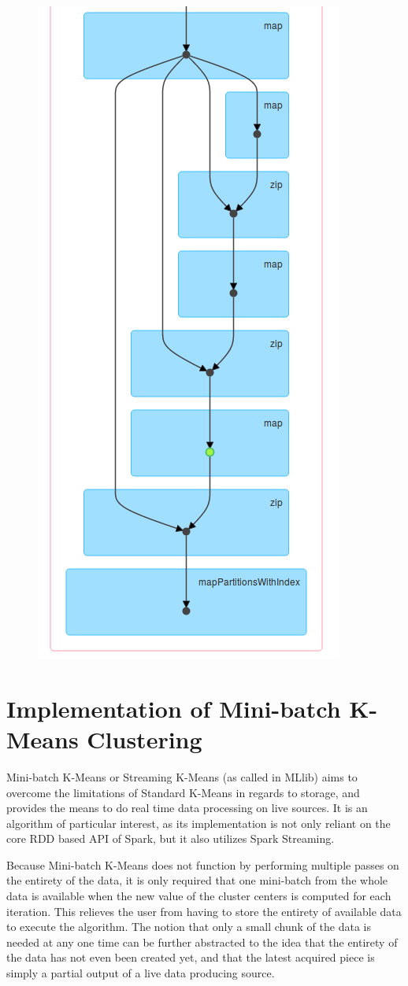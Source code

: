 \documentclass{l4proj}
\begin{document}
\begin{figure}[H]
\begin{minipage}{.5\textwidth}
  \includegraphics[width=0.6\linewidth]{images/DAG2}
  \label{fig:dag2}
\end{minipage}
\end{figure}

\section{Implementation of Mini-batch K-Means Clustering}

Mini-batch K-Means or Streaming K-Means (as called in MLlib) aims to overcome the limitations of Standard K-Means in regards to storage, and provides the means to do real time data processing on live sources. It is an algorithm of particular interest, as its implementation is not only reliant on the core RDD based API of Spark, but it also utilizes Spark Streaming.

Because Mini-batch K-Means does not function by performing multiple passes on the entirety of the data, it is only required that one mini-batch from the whole data is available when the new value of the cluster centers is computed for each iteration. This relieves the user from having to store the entirety of available data to execute the algorithm. The notion that only a small chunk of the data is needed at any one time can be further abstracted to the idea that the entirety of the data has not even been created yet, and that the latest acquired piece is simply a partial output of a live data producing source.
\end{document}
